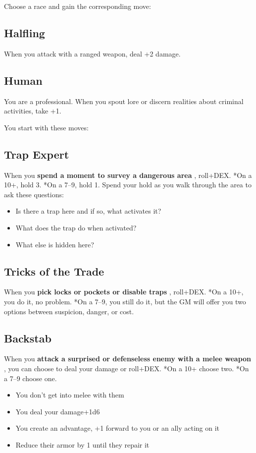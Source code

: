  Choose a race and gain the corresponding move:
\subsection{Halfling}


 When you attack with a ranged weapon, deal +2 damage.
\subsection{Human}


 You are a professional. When you spout lore or discern realities about criminal activities, take +1.


 You start with these moves:
\subsection{Trap Expert}


 When you \textbf{spend a moment to survey a dangerous area}
, roll+DEX. *On a 10+, hold 3. *On a 7--9, hold 1. Spend your hold as you walk through the area to ask these questions:
\begin{itemize}
\item Is there a trap here and if so, what activates it?
\item What does the trap do when activated?
\item What else is hidden here?

\end{itemize}
\subsection{Tricks of the Trade}


 When you \textbf{pick locks or pockets or disable traps}
, roll+DEX. *On a 10+, you do it, no problem. *On a 7--9, you still do it, but the GM will offer you two options between suspicion, danger, or cost.
\subsection{Backstab}


 When you \textbf{attack a surprised or defenseless enemy with a melee weapon}
, you can choose to deal your damage or roll+DEX. *On a 10+ choose two. *On a 7--9 choose one.
\begin{itemize}
\item You don't get into melee with them
\item You deal your damage+1d6
\item You create an advantage, +1 forward to you or an ally acting on it
\item Reduce their armor by 1 until they repair it

\end{itemize}

